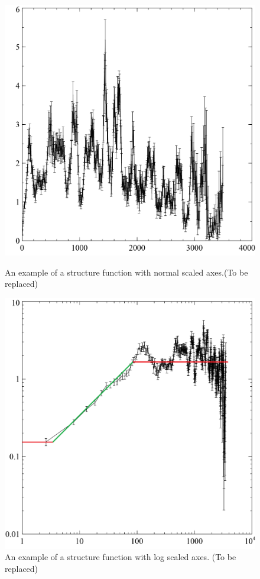 \documentclass[12pt, oneside]{smuthesis}
\begin{document}
\begin{figure}
	\centering
	\begin{minipage}{0.45\textwidth}
		\centering
		\includegraphics[width=0.8\linewidth]{structureFunctionShape}
		\caption{An example of a structure function with normal scaled axes.(To be replaced)}
		\label{fig:structureFunctionShape}
	\end{minipage}
	\begin{minipage}{0.1\textwidth}
	\end{minipage}
	\begin{minipage}{0.45\textwidth}
		\centering
		\includegraphics[width=0.8\linewidth]{structureFunctionLogShape}
		\caption{An example of a structure function with log scaled axes. (To be replaced)}
		\label{fig:structureFunctionLogShape}
	\end{minipage}
\end{figure}
\end{document}
